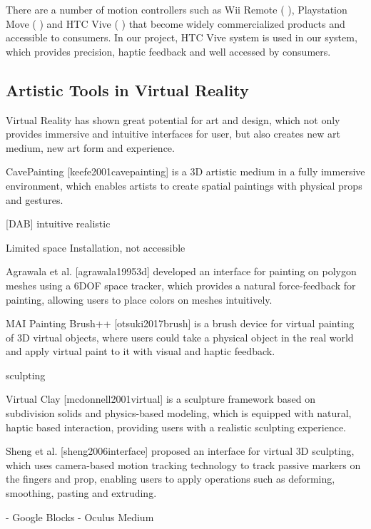 There are a number of motion controllers such as Wii Remote ( ), Playstation Move ( ) and HTC Vive ( ) that become widely commercialized products and accessible to consumers. In our project, HTC Vive system is used in our system, which provides precision, haptic feedback and well accessed by consumers.





\subsection{Artistic Tools in Virtual Reality}
\label{sec:2}


Virtual Reality has shown great potential for art and design, which not only provides immersive and intuitive interfaces for user, but also creates new art medium, new art form and experience.

CavePainting [keefe2001cavepainting] is a 3D artistic medium in a fully immersive environment, which enables artists to create spatial paintings with physical props and gestures.

[DAB] intuitive realistic

Limited space Installation, not accessible 

Agrawala et al. [agrawala19953d] developed an interface for painting on polygon meshes using a 6DOF space tracker, which provides a natural force-feedback for painting, allowing users to place colors on meshes intuitively.

MAI Painting Brush++ [otsuki2017brush] is a brush device for virtual painting of 3D virtual objects, where users could take a physical object in the real world and apply virtual paint to it with visual and haptic feedback.

sculpting

Virtual Clay [mcdonnell2001virtual] is a sculpture framework based on subdivision solids and physics-based modeling, which is equipped with natural, haptic based interaction, providing users with a realistic sculpting experience.

Sheng et al. [sheng2006interface] proposed an interface for virtual 3D sculpting, which uses camera-based motion tracking technology to track passive markers on the fingers and prop, enabling users to apply operations such as deforming, smoothing, pasting and extruding.

-	Google Blocks
-	Oculus Medium






